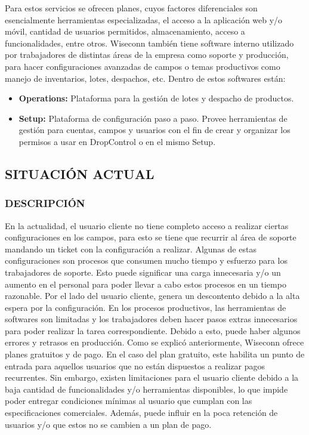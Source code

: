 Para estos servicios se ofrecen planes, cuyos factores diferenciales son esencialmente herramientas especializadas, el acceso a la aplicación web y/o móvil, cantidad de usuarios permitidos, almacenamiento, acceso a funcionalidades, entre otros.
Wiseconn también tiene software interno utilizado por trabajadores de distintas áreas de la empresa como soporte y producción, para hacer configuraciones avanzadas de campos o temas productivos como manejo de inventarios, lotes, despachos, etc. Dentro de estos softwares están:
\begin{itemize}
    \item \textbf{Operations:} Plataforma para la gestión de lotes y despacho de productos.
    \item \textbf{Setup:} Plataforma de configuración paso a paso. Provee herramientas de gestión para cuentas, campos y usuarios con el fin de crear y organizar los permisos a usar en DropControl o en el mismo Setup.
\end{itemize}

\subsection{SITUACIÓN ACTUAL}

\subsubsection{DESCRIPCIÓN}
En la actualidad, el usuario cliente no tiene completo acceso a realizar ciertas configuraciones en los campos, para esto se tiene que recurrir al área de soporte mandando un ticket con la configuración a realizar. Algunas de estas configuraciones son procesos que consumen mucho tiempo y esfuerzo para los trabajadores de soporte. Esto puede significar una carga innecesaria y/o un aumento en el personal para poder llevar a cabo estos procesos en un tiempo razonable. Por el lado del usuario cliente, genera un descontento debido a la alta espera por la configuración.
En los procesos productivos, las herramientas de softwares son limitadas y los trabajadores deben hacer pasos extras innecesarios para poder realizar la tarea correspondiente. Debido a esto, puede haber algunos errores y retrasos en producción.
Como se explicó anteriormente, Wiseconn ofrece planes gratuitos y de pago. En el caso del plan gratuito, este habilita un punto de entrada para aquellos usuarios que no están dispuestos a realizar pagos recurrentes. Sin embargo, existen limitaciones para el usuario cliente debido a la baja cantidad de funcionalidades y/o herramientas disponibles, lo que impide poder entregar condiciones mínimas al usuario que cumplan con las especificaciones comerciales. Además, puede influir en la poca retención de usuarios y/o que estos no se cambien a un plan de pago.

